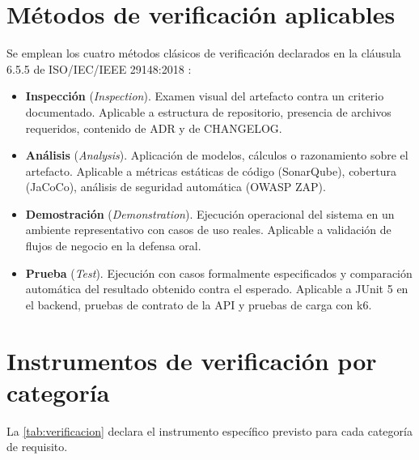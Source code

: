 \documentclass[11pt,a4paper,twoside]{report}
\begin{document}
\section{M\'etodos de verificaci\'on aplicables}

Se emplean los cuatro m\'etodos cl\'asicos de verificaci\'on declarados en la cl\'ausula 6.5.5 de ISO/IEC/IEEE 29148:2018 \cite{iso29148}:

\begin{itemize}[leftmargin=1.5em,itemsep=3pt]
    \item \textbf{Inspecci\'on} (\emph{Inspection}). Examen visual del artefacto contra un criterio documentado. Aplicable a estructura de repositorio, presencia de archivos requeridos, contenido de ADR y de CHANGELOG.
    \item \textbf{An\'alisis} (\emph{Analysis}). Aplicaci\'on de modelos, c\'alculos o razonamiento sobre el artefacto. Aplicable a m\'etricas est\'aticas de c\'odigo (SonarQube), cobertura (JaCoCo), an\'alisis de seguridad autom\'atica (OWASP ZAP).
    \item \textbf{Demostraci\'on} (\emph{Demonstration}). Ejecuci\'on operacional del sistema en un ambiente representativo con casos de uso reales. Aplicable a validaci\'on de flujos de negocio en la defensa oral.
    \item \textbf{Prueba} (\emph{Test}). Ejecuci\'on con casos formalmente especificados y comparaci\'on autom\'atica del resultado obtenido contra el esperado. Aplicable a JUnit 5 en el backend, pruebas de contrato de la API y pruebas de carga con k6.
\end{itemize}

\section{Instrumentos de verificaci\'on por categor\'ia}

La \cref{tab:verificacion} declara el instrumento espec\'ifico previsto para cada categor\'ia de requisito.
\end{document}
